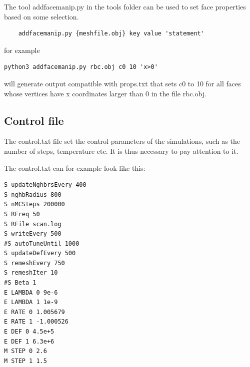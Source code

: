 \documentclass[11pt]{article}
\begin{document}
The tool addfacemanip.py in the tools folder can be used to set face properties based on some selection.
\begin{mdframed}[backgroundcolor=lightgray, linecolor=lightgray]  %
\begin{verbatim}
    addfacemanip.py {meshfile.obj} key value 'statement'
\end{verbatim}
\end{mdframed}
for example
\begin{mdframed}[backgroundcolor=lightgray, linecolor=lightgray]  %
\begin{verbatim}
python3 addfacemanip.py rbc.obj c0 10 'x>0'
\end{verbatim}
\end{mdframed}
will generate output compatible with props.txt that sets c0 to 10 for all faces whose vertices have x coordinates larger than 0 in the file rbc.obj.

\subsection{Control file}
The control.txt file set the control parameters of the simulations, such as the number of steps, temperature etc. It is thus necessary to pay attention to it.

\noindent
The control.txt can for example look like this:

\begin{mdframed}[backgroundcolor=lightgray, linecolor=lightgray]  %

\begin{verbatim}
S updateNghbrsEvery 400
S nghbRadius 800
S nMCSteps 200000
S RFreq 50
S RFile scan.log
S writeEvery 500
#S autoTuneUntil 1000
S updateDefEvery 500
S remeshEvery 750
S remeshIter 10
#S Beta 1
E LAMBDA 0 9e-6
E LAMBDA 1 1e-9
E RATE 0 1.005679
E RATE 1 -1.000526
E DEF 0 4.5e+5
E DEF 1 6.3e+6
M STEP 0 2.6
M STEP 1 1.5
\end{verbatim}
\end{mdframed}
\noindent
\end{document}

